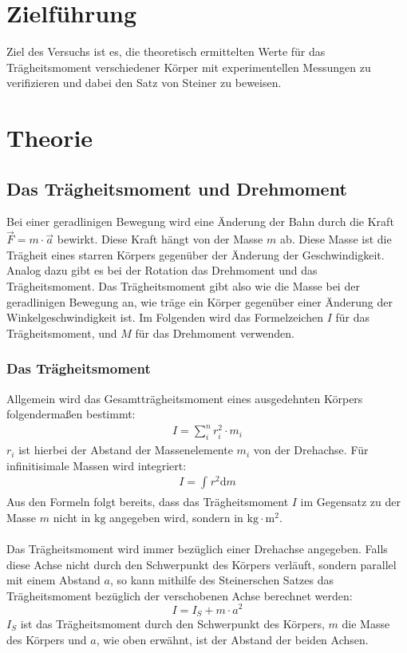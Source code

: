 \section{Zielführung}
Ziel des Versuchs ist es, die theoretisch ermittelten Werte für das Trägheitsmoment
verschiedener Körper mit experimentellen Messungen zu verifizieren und dabei den
Satz von Steiner zu beweisen.

\section{Theorie}
\label{sec:Theorie}
\subsection{Das Trägheitsmoment und Drehmoment}

Bei einer geradlinigen Bewegung wird eine Änderung der Bahn durch die Kraft $\vec{F} = m \cdot \vec{a}$ bewirkt.
Diese Kraft hängt von der Masse $m$ ab. Diese Masse ist die Trägheit eines starren Körpers gegenüber der Änderung
der Geschwindigkeit. 
\\
Analog dazu gibt es bei der Rotation das Drehmoment und das Trägheitsmoment. Das Trägheitsmoment gibt also wie die 
Masse bei der geradlinigen Bewegung an, wie träge ein Körper gegenüber einer Änderung der Winkelgeschwindigkeit ist.
Im Folgenden wird das Formelzeichen $I$ für das Trägheitsmoment, und $M$ für das Drehmoment verwenden.
\\

\subsubsection{Das Trägheitsmoment}

Allgemein wird das Gesamtträgheitsmoment eines ausgedehnten Körpers folgendermaßen bestimmt:
\begin{align*}
    I = \sum_{i}^{n} r_i^2 \cdot m_i
\end{align*}
$r_i$ ist hierbei der Abstand der Massenelemente $m_i$ von der Drehachse.
Für infinitisimale Massen wird integriert:
\begin{align}
    \label{eqn:I}
    I = \int_{}^{}r^2 \mathrm{d}m
\end{align}
Aus den Formeln folgt bereits, dass das Trägheitsmoment $I$ im Gegensatz zu der Masse $m$ nicht in $\mathrm{kg}$ angegeben wird,
sondern in $\mathrm{kg} \cdot \mathrm{m}^2$.
\\ \\
Das Trägheitsmoment wird immer bezüglich einer Drehachse angegeben. Falls diese Achse nicht durch den Schwerpunkt des Körpers
verläuft, sondern parallel mit einem Abstand $a$, so kann mithilfe des Steinerschen Satzes das Trägheitsmoment bezüglich
der verschobenen Achse berechnet werden:
\begin{equation}
    \label{eqn:Steiner}
    I = I_S + m \cdot a^2
\end{equation}
$I_S$ ist das Trägheitsmoment durch den Schwerpunkt des Körpers, $m$ die Masse des Körpers und $a$, wie oben erwähnt, ist der 
Abstand der beiden Achsen.

